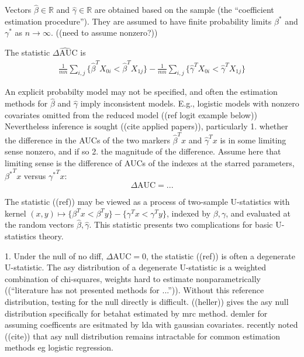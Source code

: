 \documentclass[12pt]{article}
\newcommand{\X}[1][]{X_{0#1}}
\newcommand{\Y}[1][]{X_{1#1}}
\renewcommand{\t}[1]{{#1}^T}
\renewcommand{\star}[1]{{#1}^\ast}
\newcommand{\m}{m}
\newcommand{\n}{n}
\newcommand{\aucdiff}{\Delta\text{AUC}}
\newcommand{\aucdiffhat}{\hat{\Delta\text{AUC}}}
\newcommand{\kernel}[2]{\{#1 < #2\}}
\theoremstyle{definition}
\begin{document}
Vectors $\hat\beta \in \mathbb{R}$ and $\hat\gamma \in \mathbb{R}$ are
obtained based on the sample (the ``coefficient estimation procedure''). They are assumed to have finite 
probability limits $\star\beta$ and $\star\gamma$ as $n\to\infty$. ((need to assume nonzero?))

The statistic $\aucdiffhat$ is
\begin{align}
  \frac{1}{\m\n}\sum_{i,j}\kernel{\t{\hat\beta}\X[i]}{\t{\hat\beta}\Y[j]}
  -  \frac{1}{\m\n}\sum_{i,j}\kernel{\t{\hat\gamma}\X[i]}{\t{\hat\gamma}\Y[j]} 
\end{align}


An explicit probabilty model may not be specified, and often the 
estimation methods for $\hat\beta$ and $\hat\gamma$ imply inconsistent models. E.g., logistic models
with nonzero covariates omitted from the reduced model ((ref logit example below))
 Nevertheless
inference is sought ((cite applied papers)), particularly 1. whether
the difference in the AUCs of the two markers $\t{\hat\beta} x$ and
$\t{\hat\gamma} x$ is in some limiting sense  nonzero, and if so
2. the magnitude of the difference. Assume here that limiting sense is the difference of AUCs of the indexes at the starred parameters, $\t{\star\beta} x$ versus $\t{\star\gamma} x$:
\[
  \aucdiff=...
\]

The statistic ((ref)) may be viewed as a process of two-sample U-statistics with
kernel
$(x,y)\mapsto \kernel{\t\beta x}{\t\beta y} - \kernel{\t\gamma x }{ \t\gamma y}$, indexed by $\beta,\gamma$, and
evaluated at the random vectors $\hat\beta,\hat\gamma$. This statistic
presents two complications for basic U-statistics theory.

1. Under the null of no diff, $\aucdiff=0$, the statistic ((ref)) is
often a degenerate U-statistic. The asy distribution of a degenerate
U-statistic is a weighted combination of chi-squares, weights hard to
estimate nonparametrically ((``literature has not presented methods
for ...'')). Without this reference distribution, testing for the null
directly is difficult. ((heller)) gives the asy null distribution
specifically for betahat estimated by mrc
method. %
demler for assuming coefficents are esitmated by lda with gaussian
covariates. recently noted ((cite)) that asy null distribution remains
intractable for common estimation methods eg logistic regression.
\end{document}
